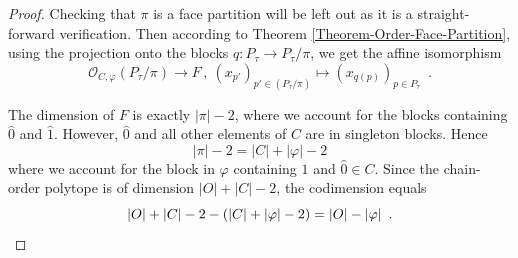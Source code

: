 \documentclass[10pt,a4paper]{amsart}
\newcommand{\OP}{\mathcal{O}}
\newcommand{\Ptau}{P_\tau}
\begin{document}
\begin{proof}
Checking that $\pi$ is a face partition will be left out as it is a straight-forward verification.
Then according to Theorem \ref{Theorem-Order-Face-Partition}, using the projection onto the blocks $q:P_\tau\rightarrow P_\tau/\pi$, we get the affine isomorphism
\[
   \OP_{C,\varphi}(P_\tau/\pi)\rightarrow F \,,\ (x_{p'})_{p'\in (\Ptau/\pi)}\mapsto (x_{q(p)})_{p\in \Ptau} \enspace .
\]

The dimension of $F$ is exactly $|\pi|-2$, where we account for the blocks containing $\hat{0}$ and $\hat{1}$.
% 
However, $\hat{0}$ and all other elements of $C$ are in singleton blocks.
Hence
% 
\begin{equation*}
    |\pi|-2=|C|+|\varphi|-2
\end{equation*}
% 
where we account for the block in $\varphi$ containing $\hat{1}$ and $\hat{0}\in C$.
Since the chain-order polytope is of dimension $|O|+|C|-2$, the codimension equals
\begin{equation*}
    |O|+|C|-2-(|C|+|\varphi|-2)=|O|-|\varphi| \enspace . \qedhere
\end{equation*}
\end{proof}
\end{document}

